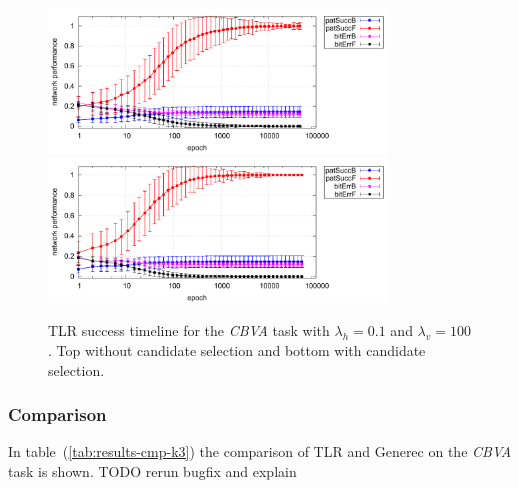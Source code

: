 \begin{figure}[H]
  \centering
  \includegraphics[width=0.8\textwidth]{img/tlr-k3-3-best-perf.pdf}   
  \includegraphics[width=0.8\textwidth]{img/tlr-k3-3-best-can.pdf}      
  \caption{TLR success timeline for the \emph{CBVA} task with $\lambda_h=0.1$ and $\lambda_v=100$. Top without candidate selection and bottom with candidate selection. }
  \label{fig:results-tlr-k3-epoch} 
\end{figure}

\subsubsection{Comparison} 
\label{sec:results-cmp-k3} 

In table~(\ref{tab:results-cmp-k3}) the comparison of TLR and Generec on the \emph{CBVA} task is shown. TODO rerun bugfix and explain 


